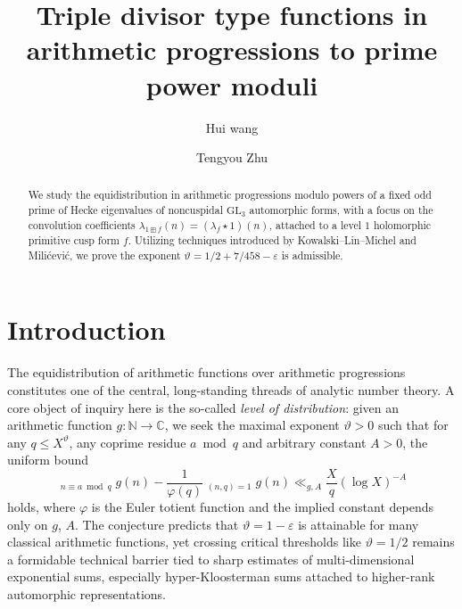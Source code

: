 \documentclass[11pt,reqno]{amsart}
\numberwithin{equation}{section}
\theoremstyle{plain}
\theoremstyle{definition}
\begin{document}
\title[Triple divisor type functions in arithmetic progressions]
{Triple divisor type functions in arithmetic progressions to prime power moduli}

\author{Hui wang}
\address{The University of Hong Kong Shenzhen Institute of Research and Innovation, 
  Shenzhen, Guangdong 518052, China}

\author{Tengyou Zhu}
\address{Data Science Institute, Shandong University
                       \\Jinan, Shandong 250100, China}


\begin{abstract}
We study the equidistribution in arithmetic progressions modulo powers of a fixed odd prime of Hecke eigenvalues of noncuspidal $\mathrm{GL}_3$ 
automorphic forms, 
with a focus on the convolution coefficients $\lambda_{1\boxplus f}(n)=(\lambda_f\star 1)(n)$,
attached to a level $1$ holomorphic primitive cusp form $f$. 
Utilizing techniques introduced by Kowalski--Lin--Michel and Mili\'{c}evi\'{c}, 
we prove the exponent $\vartheta=1/2+7/458-\varepsilon$ is admissible.
\end{abstract}

\maketitle

\section{Introduction}
The equidistribution of arithmetic functions over arithmetic progressions constitutes one of the central, 
long-standing threads of analytic number theory. 
A core object of inquiry here is the so-called \emph{level of distribution}: given an arithmetic function
$g:\mathbb{N}\rightarrow\mathbb{C}$,  we seek the maximal exponent $\vartheta>0$ such that
for any $q\leq X^{\vartheta}$, any coprime residue $a\bmod q$ and arbitrary constant $A>0$, the uniform bound
\begin{equation}\label{level-of-distribution}
\mathop{\sum_{n\leq X}}_{n\equiv a \bmod q}g(n)-\frac{1}{\varphi(q)}\mathop{\sum_{n\leq X}}_{(n,q)=1}g(n)
\ll_{g,A} \frac{X}{q}\left(\log X\right)^{-A}
\end{equation}
holds, where $\varphi$ is the Euler totient function and the implied constant depends only on $g$, $A$.
The conjecture predicts that $\vartheta \!=\!1-\varepsilon$ is attainable for 
many classical arithmetic functions, yet crossing critical thresholds like $\vartheta=1/2$ 
remains a formidable technical barrier tied to sharp estimates of multi-dimensional exponential sums,
especially hyper-Kloosterman sums attached to higher-rank automorphic representations.
\end{document}
